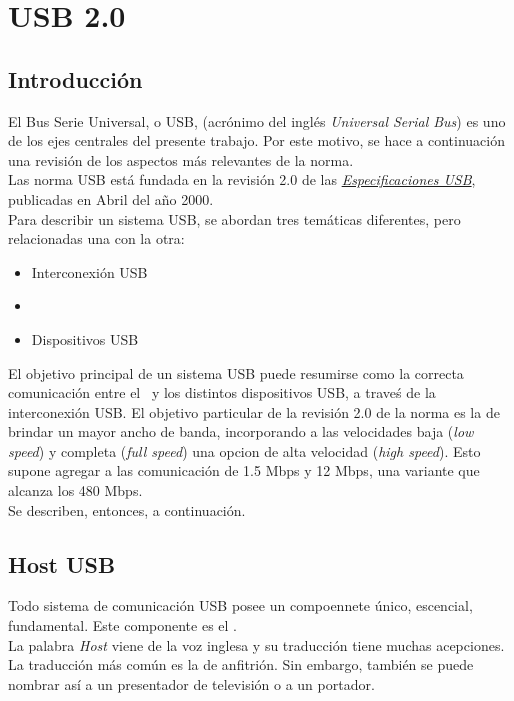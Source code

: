 \chapter{USB 2.0}

  \section{Introducción}
  El Bus Serie Universal, o USB, (acrónimo del inglés {\it Universal Serial Bus})
  es uno de los ejes centrales del presente trabajo. Por este motivo, se hace a
  continuación una revisión de los aspectos más relevantes de la norma.\\

  Las norma USB está fundada en la revisión 2.0 de las
  \href{www.usb.org}{\it Especificaciones USB}, publicadas en Abril del año
  2000.\\

  Para describir un sistema USB, se abordan tres temáticas diferentes, pero
  relacionadas una con la otra:

  \begin{itemize}
    \item Interconexión USB
    \item \host
    \item Dispositivos USB
  \end{itemize}

  El objetivo principal de un sistema USB puede resumirse como la correcta
  comunicación entre el \host ~y los distintos dispositivos USB, a traveś de
  la interconexión USB. El objetivo particular de la revisión 2.0 de la norma es
  la de brindar un mayor ancho de banda, incorporando a las velocidades baja
  ({\it low speed}) y completa ({\it full speed}) una opcion de alta velocidad
  ({\it high speed}). Esto supone agregar a las comunicación de 1.5 Mbps y 12
  Mbps, una variante que alcanza los 480 Mbps.\\

  Se describen, entonces, a continuación.

  \section{Host USB}
  Todo sistema de comunicación USB posee un compoennete único, escencial,
  fundamental. Este componente es el \host.\\

  La palabra {\it Host} viene de la voz inglesa y su traducción tiene muchas
  acepciones. La traducción más común es la de anfitrión. Sin embargo, también
  se puede nombrar así a un presentador de televisión o a un portador.\\


